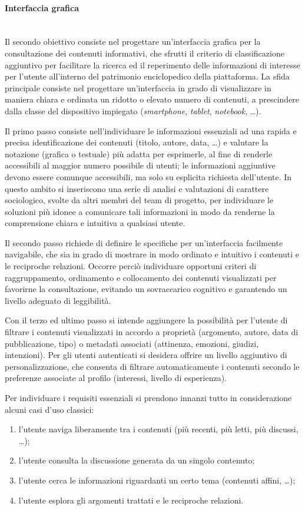 \paragraph{Interfaccia grafica} \hfill \\
Il secondo obiettivo consiste nel progettare un'interfaccia grafica per la consultazione dei contenuti informativi, che sfrutti il criterio di classificazione aggiuntivo per facilitare la ricerca ed il reperimento delle informazioni di interesse per l'utente all'interno del patrimonio enciclopedico della piattaforma. La sfida principale consiste nel progettare un'interfaccia in grado di visualizzare in maniera chiara e ordinata un ridotto o elevato numero di contenuti, a prescindere dalla classe del dispositivo impiegato (\textit{smartphone}, \textit{tablet}, \textit{notebook}, \ldots).

Il primo passo consiste nell'individuare le informazioni essenziali ad una rapida e precisa identificazione dei contenuti (titolo, autore, data, \ldots) e valutare la notazione (grafica o testuale) più adatta per esprimerle, al fine di renderle accessibili al maggior numero possibile di utenti; le informazioni aggiuntive devono essere comunque accessibili, ma solo su esplicita richiesta dell'utente. In questo ambito si inseriscono una serie di analisi e valutazioni di carattere sociologico, svolte da altri membri del team di progetto, per individuare le soluzioni più idonee a comunicare tali informazioni in modo da renderne la comprensione chiara e intuitiva a qualsiasi utente.

Il secondo passo richiede di definire le specifiche per un'interfaccia facilmente navigabile, che sia in grado di mostrare in modo ordinato e intuitivo i contenuti e le reciproche relazioni. Occorre perciò individuare opportuni criteri di raggruppamento, ordinamento e collocamento dei contenuti visualizzati per favorirne la consultazione, evitando un sovraccarico cognitivo e garantendo un livello adeguato di leggibilità.

Con il terzo ed ultimo passo si intende aggiungere la possibilità per l'utente di filtrare i contenuti visualizzati in accordo a proprietà (argomento, autore, data di pubblicazione, tipo) o metadati associati (attinenza, emozioni, giudizi, intenzioni). Per gli utenti autenticati si desidera offrire un livello aggiuntivo di personalizzazione, che consenta di filtrare automaticamente i contenuti secondo le preferenze associate al profilo (interessi, livello di esperienza).

Per individuare i requisiti essenziali si prendono innanzi tutto in considerazione alcuni casi d'uso classici:
\begin{enumerate}
\item l'utente naviga liberamente tra i contenuti (più recenti, più letti, più discussi, \ldots);
\item l'utente consulta la discussione generata da un singolo contenuto;
\item l'utente cerca le informazioni riguardanti un certo tema (contenuti affini, \ldots);
\item l'utente esplora gli argomenti trattati e le reciproche relazioni.
\end{enumerate}

